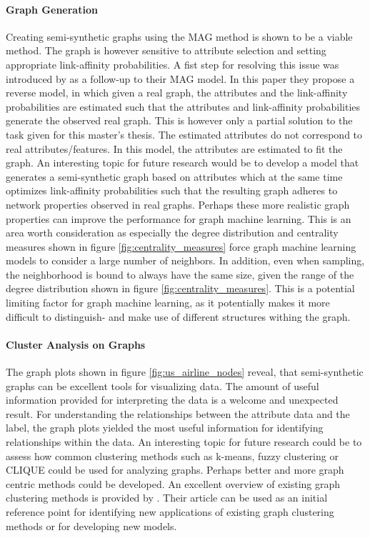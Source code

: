   \paragraph{Graph Generation} \mbox{}
  
  \noindent Creating semi-synthetic graphs using the MAG method is shown to be a 
  viable method. The graph is however sensitive to attribute selection and 
  setting appropriate link-affinity probabilities. A fist step for resolving
  this issue was introduced by \cite{kim2011modeling} as a follow-up to their
  MAG model. In this paper they propose a reverse model, in which given a real
  graph, the attributes and the link-affinity probabilities are estimated such 
  that the attributes and link-affinity probabilities generate the observed real
  graph. This is however only a partial solution to the task given for this
  master's thesis. The estimated attributes do not correspond to real 
  attributes/features. In this model, the attributes are estimated to fit the 
  graph. An interesting topic for future research would be to develop a model 
  that generates a semi-synthetic graph based on attributes which at the same
  time optimizes link-affinity probabilities such that the resulting graph
  adheres to network properties observed in real graphs. Perhaps these more
  realistic graph properties can improve the performance for graph machine
  learning. This is an area worth consideration as especially the degree
  distribution and centrality measures shown in figure 
  \ref{fig:centrality_measures} force graph machine learning models to consider
  a large number of neighbors. In addition, even when sampling, the
  neighborhood is bound to always have the same size, given the range of the
  degree distribution shown in figure \ref{fig:centrality_measures}. This is a
  potential limiting factor for graph machine learning, as it potentially makes
  it more difficult to distinguish- and make use of different structures
  withing the graph.

  \paragraph{Cluster Analysis on Graphs} \mbox{}

  \noindent The graph plots shown in figure \ref{fig:us_airline_nodes} reveal,
  that semi-synthetic graphs can be excellent tools for visualizing data. The
  amount of useful information provided for interpreting the data is a welcome
  and unexpected result. For understanding the relationships between the
  attribute data and the label, the graph plots yielded the most useful
  information for identifying relationships within the data. An interesting
  topic for future research could be to assess how common clustering methods
  such as k-means, fuzzy clustering or CLIQUE could be used for analyzing
  graphs. Perhaps better and more graph centric methods could be developed. An
  excellent overview of existing graph clustering methods is provided by
  \cite{zhou2020graph}. Their article can be used as an initial reference point
  for identifying new applications of existing graph clustering methods or for 
  developing new models.

